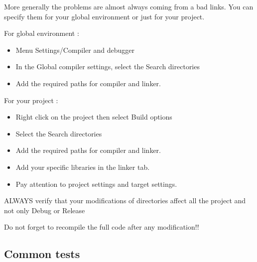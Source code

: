 \documentclass[amsmath,amssymb,nofootinbib]{revtex4-2}
\begin{document}
More generally the problems are almost always coming from a bad links.
 You can specify them for your global environment or just for your project.

For global environment :
\begin{itemize}
	\item Menu Settings/Compiler and debugger
\item In the Global compiler settings, select the Search directories
\item Add the required paths for compiler and linker.
\end{itemize}


For your project :
\begin{itemize}
	\item  Right click on the project then select Build options
\item Select the Search directories
\item Add the required paths for compiler and linker.
\item  Add your specific libraries in the linker tab.
\item Pay attention to project settings and target settings. 
\end{itemize}



ALWAYS verify that your modifications of directories affect  all the project and not only Debug or Release 

Do not forget to recompile the full code after any modification!!


\subsection{Common tests}
\end{document}

